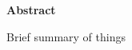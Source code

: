 
%




\begin{alwayssingle} 
 \thispagestyle{empty}
 \begin{center}
   \vspace*{1.5cm}
   {\Large \bfseries  Abstract}
 \end{center}
 \vspace{0.5cm}
 Brief summary of things
\end{alwayssingle}



